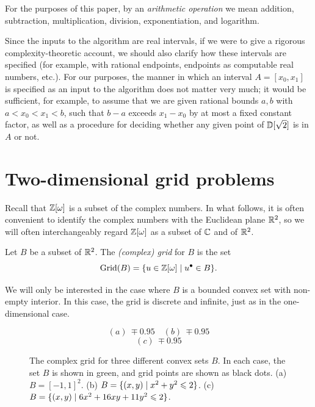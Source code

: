 \documentclass{article}
\begin{document}
\begin{remark}
  For the purposes of this paper, by an {\em arithmetic operation} we
  mean addition, subtraction, multiplication, division,
  exponentiation, and logarithm.
\end{remark}

\begin{remark}\label{rem-interval-specify}
  Since the inputs to the algorithm are real intervals, if we were to
  give a rigorous complexity-theoretic account, we should also clarify
  how these intervals are specified (for example, with rational
  endpoints, endpoints as computable real numbers, etc.). For our
  purposes, the manner in which an interval $A=[x_0,x_1]$ is specified
  as an input to the algorithm does not matter very much; it would be
  sufficient, for example, to assume that we are given rational bounds
  $a,b$ with $a< x_0 < x_1 < b$, such that $b-a$ exceeds $x_1-x_0$ by
  at most a fixed constant factor, as well as a procedure for deciding
  whether any given point of ${\mathbb{D}}[\sqrt 2]$ is in $A$ or not.
\end{remark}

\section{Two-dimensional grid problems}
\label{sec-grid-2d}

Recall that $\mathbb{Z}[\omega]$ is a subset of the complex numbers. In what
follows, it is often convenient to identify the complex numbers with
the Euclidean plane ${\mathbb{R}}^2$, so we will often interchangeably regard
$\mathbb{Z}[\omega]$ as a subset of ${\mathbb{C}}$ and of ${\mathbb{R}}^2$.

\begin{definition}
  Let $B$ be a subset of ${\mathbb{R}}^2$. The {\em (complex) grid} for $B$ is
  the set
  \begin{equation}
    \mathop{\rm Grid}\nolimits(B) = \{ u\in\mathbb{Z}[\omega] \mid u^{\bullet} \in B\}.
  \end{equation}
\end{definition}

We will only be interested in the case where $B$ is a bounded convex
set with non-empty interior. In this case, the grid is discrete and
infinite, just as in the one-dimensional case.

\begin{figure}
  \[ (a)~
  \mp{0.95}{}
  \quad (b)~
  \mp{0.95}{}
  \]
  \[ (c)~
  \mp{0.95}{}
  \]
  \caption{The complex grid for three different convex sets $B$. In
    each case, the set $B$ is shown in green, and grid points are
    shown as black dots. (a) $B=[-1,1]^2$. (b) $B=\{(x,y)\mid
      x^2+y^2\leqslant 2\}$. (c) $B=\{(x,y)\mid 6x^2 + 16xy + 11y^2 \leqslant
      2\}$.}
  \label{fig-grid-2d}
\end{figure}
\end{document}
